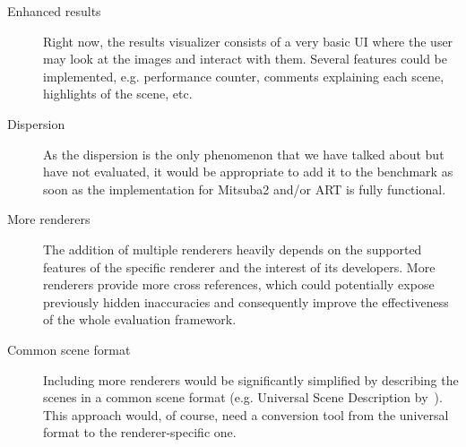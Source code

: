 \begin{description}
	\item[Enhanced results] Right now, the results visualizer consists of a very basic UI where the user may look at the images and interact with them. Several features could be implemented, e.g. performance counter, comments explaining each scene, highlights of the scene, etc.
	\item[Dispersion] As the dispersion is the only phenomenon that we have talked about but have not evaluated, it would be appropriate to add it to the benchmark as soon as the implementation for Mitsuba2 and/or ART is fully functional.
	\item[More renderers] The addition of multiple renderers heavily depends on the supported features of the specific renderer and the interest of its developers. More renderers provide more cross references, which could potentially expose previously hidden inaccuracies and consequently improve the effectiveness of the whole evaluation framework. 
	\item[Common scene format] Including more renderers would be significantly simplified by describing the scenes in a common scene format (e.g. Universal Scene Description by~\citet{usdDoc}). This approach would, of course, need a conversion tool from the universal format to the renderer-specific one.
\end{description}